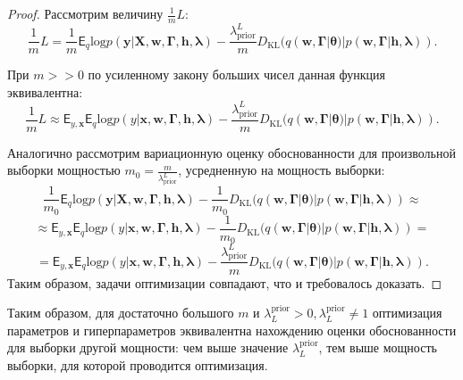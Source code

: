 \begin{proof}
Рассмотрим величину  $\frac{1}{m}L$: \\
\[
    \frac{1}{m}L = \frac{1}{m}\mathsf{E}_q \text{log}p(\mathbf{y}|\mathbf{X},  \mathbf{w}, \boldsymbol{\Gamma}, \mathbf{h}, \boldsymbol{\lambda}) - \frac{\lambda_\text{prior}^L}{m}D_\text{KL}(q(\mathbf{w}, \boldsymbol{\Gamma}|\boldsymbol{\theta})|p(\mathbf{w},\boldsymbol{\Gamma}|\mathbf{h}, \boldsymbol{\lambda})).
\]

При $m >> 0$ по усиленному закону больших чисел данная функция эквивалентна:
\[
    \frac{1}{m}L \approx  \mathsf{E}_{y, \mathbf{x}} \mathsf{E}_{q} \text{log}p(y|\mathbf{x}, \mathbf{w}, \boldsymbol{\Gamma}, \mathbf{h}, \boldsymbol{\lambda}) -\frac{\lambda_\text{prior}^L}{m}D_\text{KL}(q(\mathbf{w}, \boldsymbol{\Gamma}|\boldsymbol{\theta})|p(\mathbf{w},\boldsymbol{\Gamma}|\mathbf{h}, \boldsymbol{\lambda})).
\]

Аналогично рассмотрим вариационную оценку обоснованности для произвольной выборки мощностью $m_0 = \frac{m}{\lambda_\text{prior}^L}$, усредненную на мощность выборки:
\[
    \frac{1}{m_0}\mathsf{E}_q \text{log}p(\mathbf{y}|\mathbf{X},  \mathbf{w}, \boldsymbol{\Gamma}, \mathbf{h}, \boldsymbol{\lambda}) - \frac{1}{m_0}D_\text{KL}(q(\mathbf{w}, \boldsymbol{\Gamma}|\boldsymbol{\theta})|p(\mathbf{w},\boldsymbol{\Gamma}|\mathbf{h}, \boldsymbol{\lambda})) \approx
\]
\[
\approx  \mathsf{E}_{y, \mathbf{x}} \mathsf{E}_{q} \text{log}p(y|\mathbf{x}, \mathbf{w}, \boldsymbol{\Gamma}, \mathbf{h}, \boldsymbol{\lambda}) -\frac{1}{m_0}D_\text{KL}(q(\mathbf{w}, \boldsymbol{\Gamma}|\boldsymbol{\theta})|p(\mathbf{w},\boldsymbol{\Gamma}|\mathbf{h}, \boldsymbol{\lambda})) = 
\]
\[
= \mathsf{E}_{y, \mathbf{x}} \mathsf{E}_{q} \text{log}p(y|\mathbf{x}, \mathbf{w}, \boldsymbol{\Gamma}, \mathbf{h}, \boldsymbol{\lambda}) -\frac{\lambda_\text{prior}^L}{m}D_\text{KL}(q(\mathbf{w}, \boldsymbol{\Gamma}|\boldsymbol{\theta})|p(\mathbf{w},\boldsymbol{\Gamma}|\mathbf{h}, \boldsymbol{\lambda})).
\]
Таким образом, задачи оптимизации совпадают, что и требовалось доказать.
\end{proof}
Таким образом, для достаточно большого $m$ и $\lambda^{\text{prior}}_L>0, \lambda^{\text{prior}}_L \neq 1$ оптимизация параметров и гиперпараметров эквивалентна нахождению оценки обоснованности для выборки другой мощности: чем выше значение $ \lambda^{\text{prior}}_L$, тем выше мощность выборки, для которой проводится оптимизация.

